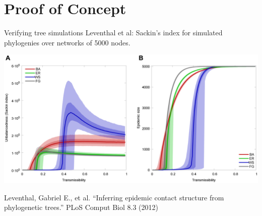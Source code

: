 \documentclass{beamer}
\begin{document}
\section{Proof of Concept}

\begin{frame}{Verifying tree simulations}
    Leventhal et al: Sackin's index for simulated phylogenies over networks of
    5000 nodes.
    \begin{center}
    \includegraphics[scale=1.5, trim=0 0 3.5cm 0, clip=true]{f1}
    \end{center}

    \tiny{Leventhal, Gabriel E., et al. ``Inferring epidemic contact structure from phylogenetic trees.'' PLoS Comput Biol 8.3 (2012)}
\end{frame}
\end{document}
